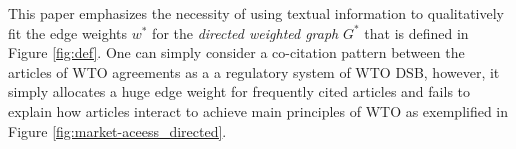 This paper emphasizes the necessity of using textual information 
to qualitatively fit the edge weights $w^*$ for the \textit{directed weighted graph} $G^*$ that is defined in Figure \ref{fig:def}. 
One can simply consider a co-citation pattern between the articles of WTO agreements as a a regulatory system of WTO DSB, however,
it simply allocates a huge edge weight for frequently cited articles and fails to explain how articles interact to achieve main principles of WTO as exemplified in Figure \ref{fig:market-aceess_directed}.








